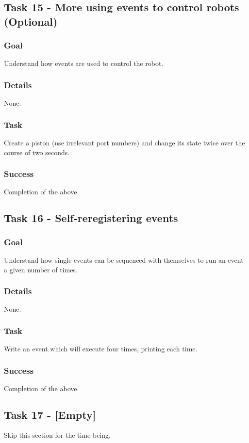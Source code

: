 \documentclass[a4paper]{article}
\begin{document}
\subsection{Task 15 - More using events to control robots (Optional)}
\subsubsection{Goal} Understand how events are used to control the robot.
\subsubsection{Details} None.
\subsubsection{Task} Create a piston (use irrelevant port numbers) and change its state twice over the course of two seconds.
\subsubsection{Success} Completion of the above.

\subsection{Task 16 - Self-reregistering events}
\subsubsection{Goal} Understand how single events can be sequenced with themselves to run an event a given number of times.
\subsubsection{Details} None.
\subsubsection{Task} Write an event which will execute four times, printing each time.
\subsubsection{Success} Completion of the above.

\subsection{Task 17 - [Empty]} Skip this section for the time being.
\end{document}
